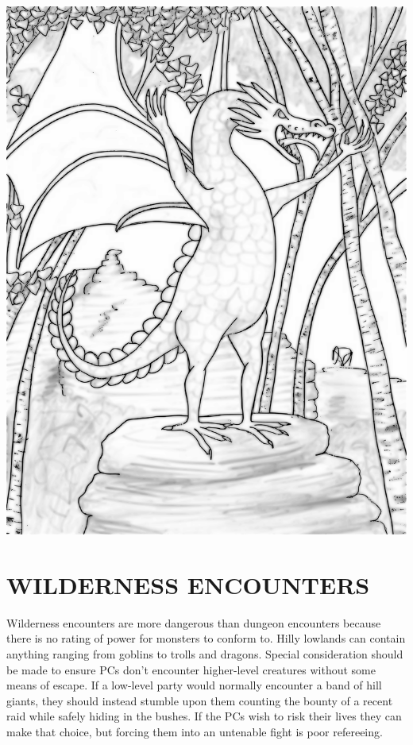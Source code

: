 \begin{multicols}{2}
\noindent\includegraphics[width=\columnwidth]{marshfield.pdf}\label{marshfield} 

\section{WILDERNESS ENCOUNTERS}

Wilderness encounters are more dangerous than dungeon encounters because there is no rating of power for monsters to conform to.  Hilly lowlands can contain anything ranging from goblins to trolls and dragons.  Special consideration should be made to ensure PCs don't encounter higher-level creatures without some means of escape.  If a low-level party would normally encounter a band of hill giants, they should instead stumble upon them counting the bounty of a recent raid while safely hiding in the bushes.  If the PCs wish to risk their lives they can make that choice, but forcing them into an untenable fight is poor refereeing.  


\end{multicols}

